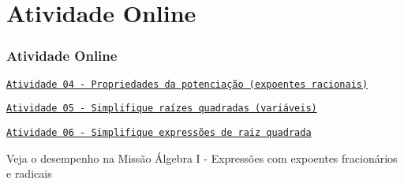 

\section{Atividade Online}
\begin{frame}
\frametitle{Atividade Online} 

\href{https://pt.khanacademy.org/math/algebra/rational-exponents-and-radicals/rational-exponents-and-the-properties-of-exponents/e/exponents_4}
{{\tt Atividade 04 - Propriedades da potenciação (expoentes
racionais)}}

\href{https://pt.khanacademy.org/math/algebra/rational-exponents-and-radicals/alg1-simplify-square-roots/e/multiplying_radicals}
{{\tt Atividade 05 - Simplifique raízes quadradas (variáveis)}}

\href{https://pt.khanacademy.org/math/algebra/rational-exponents-and-radicals/alg1-simplify-square-roots/e/adding_and_subtracting_radicals}
{{\tt Atividade 06 - Simplifique expressões de raiz quadrada}}



Veja o desempenho na Missão Álgebra I - Expressões com expoentes
fracionários e radicais

\end{frame}

